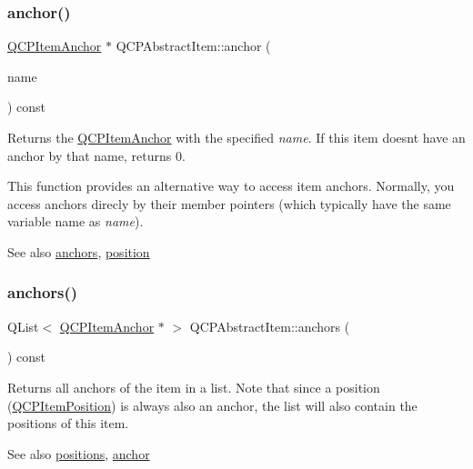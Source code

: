 \subsubsection{\texorpdfstring{anchor()}{anchor()}}
{\footnotesize\ttfamily \mbox{\hyperlink{class_q_c_p_item_anchor}{Q\+C\+P\+Item\+Anchor}} $\ast$ Q\+C\+P\+Abstract\+Item\+::anchor (\begin{DoxyParamCaption}\item[{const Q\+String \&}]{name }\end{DoxyParamCaption}) const}

Returns the \mbox{\hyperlink{class_q_c_p_item_anchor}{Q\+C\+P\+Item\+Anchor}} with the specified {\itshape name}. If this item doesn\textquotesingle{}t have an anchor by that name, returns 0.

This function provides an alternative way to access item anchors. Normally, you access anchors direcly by their member pointers (which typically have the same variable name as {\itshape name}).

\begin{DoxySeeAlso}{See also}
\mbox{\hyperlink{class_q_c_p_abstract_item_a81d1ecfea3368b836cf9675a0045e659}{anchors}}, \mbox{\hyperlink{class_q_c_p_abstract_item_a2589c3d298f9a576d77d9addb440a18d}{position}} 
\end{DoxySeeAlso}
\mbox{\label{class_q_c_p_abstract_item_a81d1ecfea3368b836cf9675a0045e659}} 
\subsubsection{\texorpdfstring{anchors()}{anchors()}}
{\footnotesize\ttfamily Q\+List$<$ \mbox{\hyperlink{class_q_c_p_item_anchor}{Q\+C\+P\+Item\+Anchor}} $\ast$ $>$ Q\+C\+P\+Abstract\+Item\+::anchors (\begin{DoxyParamCaption}{ }\end{DoxyParamCaption}) const\hspace{0.3cm}{\ttfamily [inline]}}

Returns all anchors of the item in a list. Note that since a position (\mbox{\hyperlink{class_q_c_p_item_position}{Q\+C\+P\+Item\+Position}}) is always also an anchor, the list will also contain the positions of this item.

\begin{DoxySeeAlso}{See also}
\mbox{\hyperlink{class_q_c_p_abstract_item_a709f655ac3f7f22d452714134662b454}{positions}}, \mbox{\hyperlink{class_q_c_p_abstract_item_a139c255ea8831642fac91748e29a5adb}{anchor}} 
\end{DoxySeeAlso}
\mbox{\label{class_q_c_p_abstract_item_a84914f4516f9b38ef0bd89eafe3dbda7}} 
